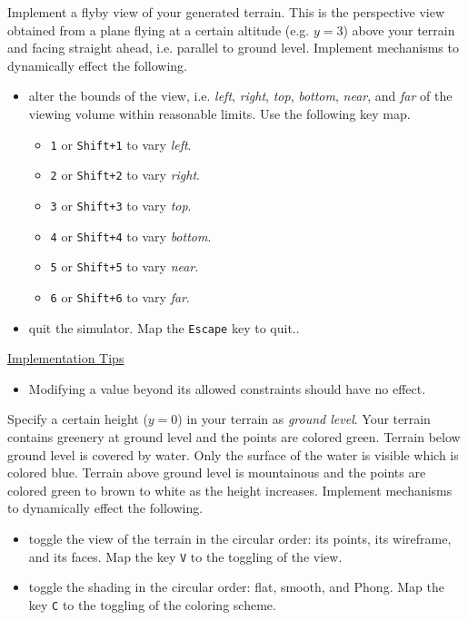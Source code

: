\documentclass[addpoints]{exam}
\begin{document}
\begin{questions}

  Implement a flyby view of your generated terrain. This is the perspective view obtained from a plane flying at a certain altitude (e.g. $y=3$) above your terrain and facing straight ahead, i.e. parallel to ground level. Implement mechanisms to dynamically effect the following.
    \begin{itemize}
    \item alter the bounds of the view, i.e. \textit{left}, \textit{right}, \textit{top}, \textit{bottom}, \textit{near}, and \textit{far} of the viewing volume within reasonable limits. Use the following key map.
      \begin{itemize}
        \item \texttt{1} or \texttt{Shift+1} to vary \textit{left}.
        \item \texttt{2} or \texttt{Shift+2} to vary \textit{right}.
        \item \texttt{3} or \texttt{Shift+3} to vary \textit{top}.
        \item \texttt{4} or \texttt{Shift+4} to vary \textit{bottom}.
        \item \texttt{5} or \texttt{Shift+5} to vary \textit{near}.
        \item \texttt{6} or \texttt{Shift+6} to vary \textit{far}.
      \end{itemize}
    \item quit the simulator. Map the \texttt{Escape} key to quit..
    \end{itemize}

    \noindent\underline{Implementation Tips}
    \begin{itemize}
    \item Modifying a value beyond its allowed constraints should have no effect.
    \end{itemize}
    

    Specify a certain height ($y=0$) in your terrain as \textit{ground level}. Your terrain contains greenery at ground level and the points are colored green. Terrain below ground level is covered by water. Only the surface of the water is visible which is colored blue. Terrain above ground level is mountainous and the points are colored green to brown to white as the height increases. Implement mechanisms to dynamically effect the following.
    \begin{itemize}
    \item toggle the view of the terrain in the circular order: its points, its wireframe, and its faces. Map the key \texttt{V} to the toggling of the view. 
    \item toggle the shading in the circular order: flat, smooth, and Phong. Map the key \texttt{C} to the toggling of the coloring scheme.
    \end{itemize}


\end{questions}
\end{document}
